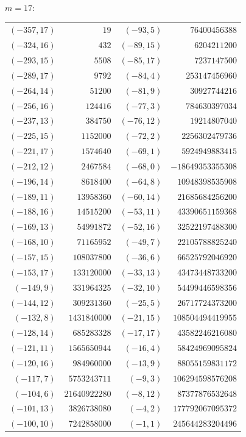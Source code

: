 \documentclass[11pt]{amsart}
\theoremstyle{definition}
\begin{document}
\noindent$m=17$:\nopagebreak\\[2pt]
{\scriptsize\begin{tabular}{@{}r@{\ \ }r@{\qquad}r@{\ \ }r@{}}
$(-357,17)$ & $19$ & $(-93,5)$ & $76400456388$ \\
$(-324,16)$ & $432$ & $(-89,15)$ & $6204211200$ \\
$(-293,15)$ & $5508$ & $(-85,17)$ & $7237147500$ \\
$(-289,17)$ & $9792$ & $(-84,4)$ & $253147456960$ \\
$(-264,14)$ & $51200$ & $(-81,9)$ & $30927744216$ \\
$(-256,16)$ & $124416$ & $(-77,3)$ & $784630397034$ \\
$(-237,13)$ & $384750$ & $(-76,12)$ & $19214807040$ \\
$(-225,15)$ & $1152000$ & $(-72,2)$ & $2256302479736$ \\
$(-221,17)$ & $1574640$ & $(-69,1)$ & $5924949883415$ \\
$(-212,12)$ & $2467584$ & $(-68,0)$ & $-18649353355308$ \\
$(-196,14)$ & $8618400$ & $(-64,8)$ & $10948398535908$ \\
$(-189,11)$ & $13958360$ & $(-60,14)$ & $21685684256200$ \\
$(-188,16)$ & $14515200$ & $(-53,11)$ & $43390651159368$ \\
$(-169,13)$ & $54991872$ & $(-52,16)$ & $32522197488300$ \\
$(-168,10)$ & $71165952$ & $(-49,7)$ & $22105788825240$ \\
$(-157,15)$ & $108037800$ & $(-36,6)$ & $66525792046920$ \\
$(-153,17)$ & $133120000$ & $(-33,13)$ & $43473448733200$ \\
$(-149,9)$ & $331964325$ & $(-32,10)$ & $54499446598356$ \\
$(-144,12)$ & $309231360$ & $(-25,5)$ & $26717724373200$ \\
$(-132,8)$ & $1431840000$ & $(-21,15)$ & $108504494419955$ \\
$(-128,14)$ & $685283328$ & $(-17,17)$ & $43582246216080$ \\
$(-121,11)$ & $1565650944$ & $(-16,4)$ & $58424969095824$ \\
$(-120,16)$ & $984960000$ & $(-13,9)$ & $88055159831172$ \\
$(-117,7)$ & $5753243711$ & $(-9,3)$ & $106294598576208$ \\
$(-104,6)$ & $21640922280$ & $(-8,12)$ & $87377876532648$ \\
$(-101,13)$ & $3826738080$ & $(-4,2)$ & $177792067095372$ \\
$(-100,10)$ & $7242858000$ & $(-1,1)$ & $245644283204496$ \\
\end{tabular}}\par\medskip
\end{document}
